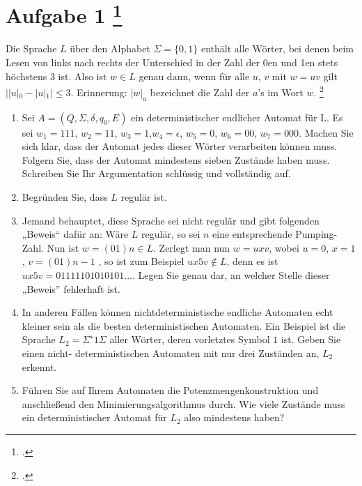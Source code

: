 \documentclass{lehramt-informatik-aufgabe}
\begin{document}
\liAufgabenTitel{}
\section{Aufgabe 1
\footcite{66115:2015:03}}

Die Sprache $L$ über den Alphabet $\Sigma = \{0, 1\}$ enthält alle
Wörter, bei denen beim Lesen von links nach rechts der Unterschied in
der Zahl der 0en und 1en stets höchstens 3 ist. Also ist $w \in L$ genau
dann, wenn für alle $u$, $v$ mit $w = uv$ gilt $||u|_0 − |u|_1| \leq 3$.
Erinnerung: $|w|_a$ bezeichnet die Zahl der $a$’s im Wort $w$.
\footcite{theoinf:ab:1}

\begin{enumerate}


\item Sei $A = (Q, \Sigma, \delta, q_0 , E)$ ein deterministischer
endlicher Automat für L. Es sei $w_1 = 111$, $w_2 = 11$, $w_3 = 1$,$ w_4
= \epsilon$, $w_5 = 0$, $w_6 = 00$, $w_7 = 000$. Machen Sie sich klar,
dass der Automat jedes dieser Wörter verarbeiten können muss. Folgern
Sie, dass der Automat mindestens sieben Zustände haben muss. Schreiben
Sie Ihr Argumentation schlüssig und vollständig auf.


\item Begründen Sie, dass $L$ regulär ist.


\item Jemand behauptet, diese Sprache sei nicht regulär und gibt
folgenden „Beweis“ dafür an: Wäre $L$ regulär, so sei $n$ eine
entsprechende Pumping-Zahl. Nun ist $w = (01) n \in L$. Zerlegt man nun
$w = uxv$, wobei $u = 0$, $x = 1$, $v = (01) n−1$ , so ist zum Beispiel
$ux 5 v \notin L$, denn es ist $ux 5 v = 01111101010101$.... Legen Sie
genau dar, an welcher Stelle dieser „Beweis” fehlerhaft ist.


\item In anderen Fällen können nichtdeterministische endliche Automaten
echt kleiner sein als die besten deterministischen Automaten. Ein
Beispiel ist die Sprache $L_2 = \Sigma^∗ 1 \Sigma$ aller Wörter, deren
vorletztes Symbol $1$ ist. Geben Sie einen nicht- deterministischen
Automaten mit nur drei Zuständen an, $L_2$ erkennt.


\item Führen Sie auf Ihrem Automaten die Potenzmengenkonstruktion und
anschließend den Minimierungsalgorithmus durch. Wie viele Zustände
muss ein deterministischer Automat für $L_2$ also mindestens haben?
\end{enumerate}
\end{document}
